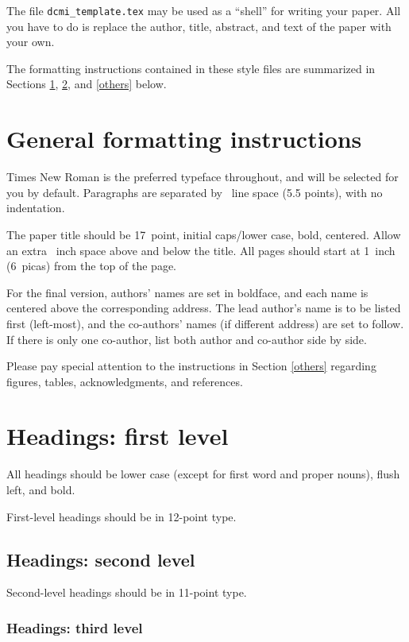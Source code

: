 \documentclass[11pt,a4paper]{article}
\begin{document}
The file \verb+dcmi_template.tex+ may be used as a ``shell'' for writing your
paper. All you have to do is replace the author, title, abstract, and text of
the paper with your own.

The formatting instructions contained in these style files are summarized in
Sections \ref{gen_inst}, \ref{headings}, and \ref{others} below.

\section{General formatting instructions}
\label{gen_inst}

Times New Roman is the preferred typeface throughout, and will be selected for you by default.
Paragraphs are separated by ~line space (5.5 points), with no
indentation.

The paper title should be 17~point, initial caps/lower case, bold, centered.
Allow an extra ~inch space above and
below the title. All pages should start at 1~inch (6~picas) from the
top of the page.

For the final version, authors' names are set in boldface, and each name is
centered above the corresponding address. The lead author's name is to be listed
first (left-most), and the co-authors' names (if different address) are set to
follow. If there is only one co-author, list both author and co-author side by
side.

Please pay special attention to the instructions in Section \ref{others}
regarding figures, tables, acknowledgments, and references.

\section{Headings: first level}
\label{headings}

All headings should be lower case (except for first word and proper nouns),
flush left, and bold.

First-level headings should be in 12-point type.

\subsection{Headings: second level}

Second-level headings should be in 11-point type.

\subsubsection{Headings: third level}
\end{document}
